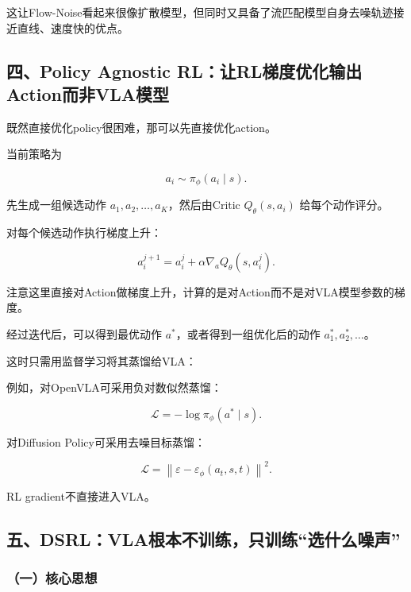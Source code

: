这让Flow-Noise看起来很像扩散模型，但同时又具备了流匹配模型自身去噪轨迹接近直线、速度快的优点。

\hypertarget{ux56dbpolicy-agnostic-rlux8ba9rlux68afux5ea6ux4f18ux5316ux8f93ux51faactionux800cux975evlaux6a21ux578b}{%
\subsection{四、Policy Agnostic RL：让RL梯度优化输出Action而非VLA模型}\label{ux56dbpolicy-agnostic-rlux8ba9rlux68afux5ea6ux4f18ux5316ux8f93ux51faactionux800cux975evlaux6a21ux578b}}

既然直接优化policy很困难，那可以先直接优化action。

当前策略为

\[
a_i\sim\pi_\phi(a_i\mid s).
\]

先生成一组候选动作 \(a_1,a_2,\ldots,a_K\)，然后由Critic \(Q_\theta(s,a_i)\) 给每个动作评分。

对每个候选动作执行梯度上升：

\[
a_i^{j+1}=a_i^j+\alpha\nabla_a Q_\theta(s,a_i^j).
\]

注意这里直接对Action做梯度上升，计算的是对Action而不是对VLA模型参数的梯度。

经过迭代后，可以得到最优动作 \(a^\ast\)，或者得到一组优化后的动作 \(a_1^\ast,a_2^\ast,\ldots\)。

这时只需用监督学习将其蒸馏给VLA：

例如，对OpenVLA可采用负对数似然蒸馏：

\[
\mathcal{L}=-\log\pi_\phi(a^\ast\mid s).
\]

对Diffusion Policy可采用去噪目标蒸馏：

\[
\mathcal{L}=\left\|\varepsilon-\varepsilon_\phi(a_t,s,t)\right\|^2.
\]

RL gradient不直接进入VLA。

\hypertarget{ux4e94dsrlvlaux6839ux672cux4e0dux8badux7ec3ux53eaux8badux7ec3ux9009ux4ec0ux4e48ux566aux58f0}{%
\subsection{五、DSRL：VLA根本不训练，只训练``选什么噪声''}\label{ux4e94dsrlvlaux6839ux672cux4e0dux8badux7ec3ux53eaux8badux7ec3ux9009ux4ec0ux4e48ux566aux58f0}}

\hypertarget{ux4e00ux6838ux5fc3ux601dux60f3-16}{%
\subsubsection{（一）核心思想}\label{ux4e00ux6838ux5fc3ux601dux60f3-16}}

